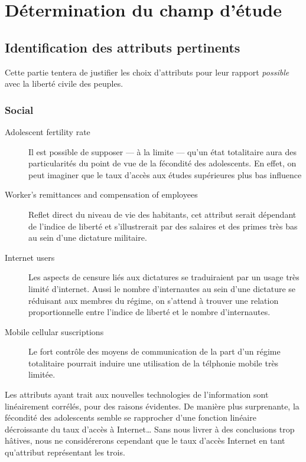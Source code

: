 
\section{Détermination du champ d'étude}
\subsection{Identification des attributs pertinents}
Cette partie tentera de justifier les choix d'attributs pour leur rapport \emph{possible} avec la liberté civile des peuples.
\subsubsection{Social}
\begin{description}
\item [Adolescent fertility rate] 
Il est possible de supposer --- à la limite --- qu'un état totalitaire aura des particularités du point de vue de la fécondité des adolescents. En effet, on peut imaginer que le taux d'accès aux études supérieures plus bas influence 
\item [Worker's remittances and compensation of employees]
Reflet direct du niveau de vie des habitants, cet attribut serait dépendant de l'indice de liberté et s'illustrerait par des salaires et des primes très bas au sein d'une dictature militaire.
\item [Internet users]
Les aspects de censure liés aux dictatures se traduiraient par un usage très limité d'internet. Aussi le nombre d'internautes 
au sein d'une dictature se réduisant aux membres du régime, on s'attend à trouver une relation proportionnelle entre l'indice de liberté et le nombre d'internautes.
\item [Mobile cellular suscriptions]
Le fort contrôle des moyens de communication de la part d'un régime totalitaire pourrait induire une utilisation de la télphonie mobile très limitée.
\end{description}

Les attributs ayant trait aux nouvelles technologies de l'information sont linéairement corrélés, pour des raisons évidentes. De manière plus surprenante, la fécondité des adolescents semble se rapprocher d'une fonction linéaire décroissante du taux d'accès à Internet\ldots
Sans nous livrer à des conclusions trop hâtives, nous ne considérerons cependant que le taux d'accès Internet en tant qu'attribut représentant les trois.

